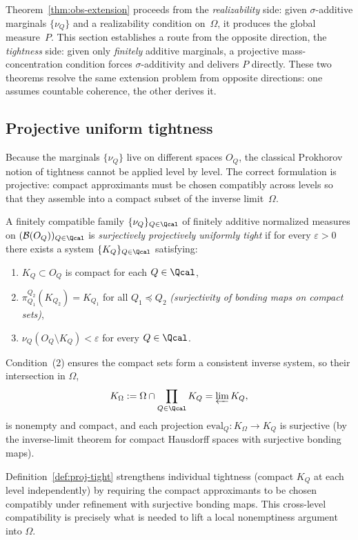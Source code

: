 Theorem~\ref{thm:obs-extension} proceeds from the \emph{realizability} side:
given $\sigma$-additive marginals $\{\nu_Q\}$ and a realizability
condition on~$\Omega$, it produces the global measure~$P$.
This section establishes a route from the opposite direction, the \emph{tightness} side:
given only \emph{finitely} additive marginals, a projective mass-concentration
condition forces $\sigma$-additivity and delivers $P$ directly.
These two theorems resolve the same extension problem from opposite directions:
one assumes countable coherence, the other derives it.

\subsection*{Projective uniform tightness}

Because the marginals $\{\nu_Q\}$ live on different spaces $O_Q$,
the classical Prokhorov notion of tightness cannot be applied
level by level.  The correct formulation is projective: compact
approximants must be chosen compatibly across levels so that they
assemble into a compact subset of the inverse limit~$\Omega$.

\begin{definition}
\label{def:proj-tight}
A finitely compatible family $\{\nu_Q\}_{Q\in\Qcal}$ of finitely
additive normalized measures on $(\mathcal{B}(O_Q))_{Q\in\Qcal}$
is \emph{surjectively projectively uniformly tight} if for every
$\varepsilon>0$ there exists a system $\{K_Q\}_{Q\in\Qcal}$ satisfying:
\begin{enumerate}
\item $K_Q\subset O_Q$ is compact for each $Q\in\Qcal$,
\item $\pi^{Q_2}_{Q_1}(K_{Q_2})=K_{Q_1}$ for all $Q_1\preceq Q_2$
      \emph{(surjectivity of bonding maps on compact sets)},
\item $\nu_Q(O_Q\setminus K_Q)<\varepsilon$ for every $Q\in\Qcal$.
\end{enumerate}
Condition~(2) ensures the compact sets form a consistent inverse system,
so their intersection in $\Omega$,
\[
K_\Omega := \Omega\cap\prod_{Q\in\Qcal} K_Q = \varprojlim K_Q,
\]
is nonempty and compact, and each projection
$\mathrm{eval}_Q:K_\Omega\to K_Q$ is surjective (by the
inverse-limit theorem for compact Hausdorff spaces with surjective
bonding maps).
\end{definition}

\begin{remark}
Definition~\ref{def:proj-tight} strengthens individual tightness
(compact $K_Q$ at each level independently) by requiring the compact
approximants to be chosen compatibly under refinement with surjective
bonding maps.  This cross-level compatibility is precisely what is
needed to lift a local nonemptiness argument into $\Omega$.
\end{remark}

